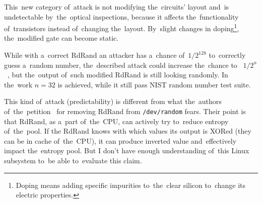 \par{
This~new category of~attack is not modifying the~circuits' layout 
and~is undetectable by~the~optical inspections, because it affects the~functionality
 of~transistors instead of~changing the~layout. By~slight changes 
 in doping\footnote{Doping means adding specific impurities to~the~clear silicon 
 to~change its electric properties.}, the~modified gate can become static.
}

\par{
While with a~correct RdRand an attacker has a~chance of~$ 1/2^{128}$ to~correctly guess 
a~random number, the~described attack could increase the~chance to~
$ 1/2^n$~\cite[Chap. 3.2, page 9]{DopantAttack}, but the~output of~such
 modified RdRand is still looking randomly. In the~work $n = 32$ is achieved,
while it still pass NIST random number test suite.
}

\par{
This kind of~attack (predictability) is different from what the~authors of~the~petition~\cite{PetitionRdRand} for removing RdRand from {\tt /dev/random} fears. Their point is that RdRand, as a~part of~the~CPU, can actively try to~reduce entropy of~the~pool. If the RdRand knows with which values its output is XORed (they can be in cache of~the~CPU), it can produce inverted value and~effectively impact the~entropy pool. But I don't have enough understanding of~this Linux subsystem to~be able to~evaluate this claim.
}
